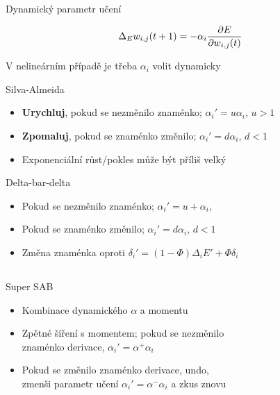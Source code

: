 \documentclass{beamer}
\begin{document}
\subsection{}
\begin{frame}{Dynamický parametr učení}
\begin{center}
$$\Delta_E w_{i,j}(t+1) = -\alpha_i{\partial E \over \partial w_{i,j}(t)}$$

V nelineárním případě je třeba $\alpha_i$ volit dynamicky

\begin{block}{Silva-Almeida}
\begin{itemize}
\item {\bf Urychluj}, pokud se nezměnilo znaménko; $\alpha_i' = u\alpha_i$, $u > 1$
\item {\bf Zpomaluj}, pokud se znaménko změnilo; $\alpha_i' = d\alpha_i$, $d < 1$
\item Exponenciální růst/pokles může být příliš velký
\end{itemize}
\end{block}

\begin{block}{Delta-bar-delta}
\begin{itemize}
\item Pokud se nezměnilo znaménko; $\alpha_i' = u+\alpha_i$,
\item Pokud se znaménko změnilo; $\alpha_i' = d\alpha_i$, $d < 1$
\item Změna znaménka oproti $\delta_i' = (1-\Phi)\Delta_iE' + \Phi\delta_i$
\end{itemize}
\end{block}
\end{center}
\end{frame}

\subsection{}
\begin{frame}{Super SAB}
\begin{itemize}
\item Kombinace dynamického $\alpha$ a momentu
\item Zpětné šíření s momentem; pokud se nezměnilo \\ znaménko derivace, $\alpha_i' = \alpha^+\alpha_i$
\item Pokud se změnilo znaménko derivace, undo, \\ zmenši parametr učení $\alpha_i' = \alpha^-\alpha_i$ a zkus znovu
\end{itemize}
\end{frame}
\end{document}
